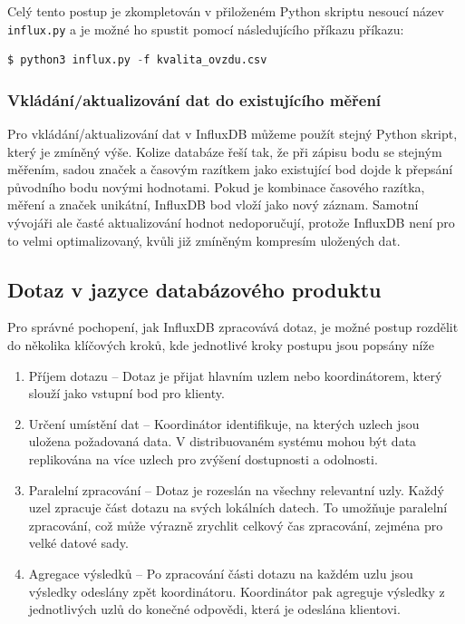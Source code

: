\documentclass[a4paper, 11pt]{article}
\begin{document}
            Celý tento postup je zkompletován v přiloženém Python skriptu nesoucí název \texttt{influx.py} a je možné ho spustit pomocí 
    následujícího příkazu příkazu:
    \begin{lstlisting}[style=Python, language=Python, framesep=10pt]
        $ python3 influx.py -f kvalita_ovzdu.csv
    \end{lstlisting}

        \subsubsection{Vkládání/aktualizování dat do existujícího měření}
        Pro vkládání/aktualizování dat v InfluxDB můžeme použít stejný Python skript, který je zmíněný výše. Kolize databáze řeší tak, že při zápisu bodu se stejným měřením, sadou značek a časovým razítkem jako existující bod dojde k přepsání původního bodu novými hodnotami. Pokud je kombinace časového razítka, měření a značek unikátní, InfluxDB bod vloží jako nový záznam. Samotní vývojáři ale časté aktualizování hodnot nedoporučují, protože InfluxDB není pro to velmi optimalizovaný, kvůli již zmíněným kompresím uložených dat.
    
    \subsection{Dotaz v jazyce databázového produktu}
    
        Pro správné pochopení, jak InfluxDB zpracovává dotaz, je možné postup rozdělit do několika klíčových kroků, kde jednotlivé kroky postupu jsou popsány níže

        \begin{enumerate}
            \item Příjem dotazu -- Dotaz je přijat hlavním uzlem nebo koordinátorem, který slouží jako vstupní bod pro klienty.
            \item Určení umístění dat -- Koordinátor identifikuje, na kterých uzlech jsou uložena požadovaná data. V distribuovaném systému mohou být data replikována na více uzlech pro zvýšení dostupnosti a odolnosti.
            \item Paralelní zpracování -- Dotaz je rozeslán na všechny relevantní uzly. Každý uzel zpracuje část dotazu na svých lokálních datech. To umožňuje paralelní zpracování, což může výrazně zrychlit celkový čas zpracování, zejména pro velké datové sady.
            \item Agregace výsledků -- Po zpracování části dotazu na každém uzlu jsou výsledky odeslány zpět koordinátoru. Koordinátor pak agreguje výsledky z jednotlivých uzlů do konečné odpovědi, která je odeslána klientovi.
        \end{enumerate}
    
\end{document}
